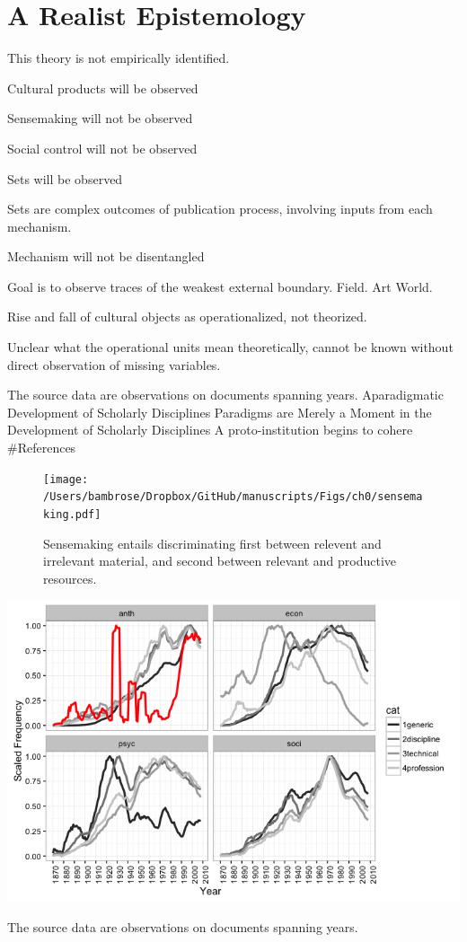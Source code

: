 \documentclass[]{article}
\begin{document}
\section{A Realist Epistemology}\label{a-realist-epistemology}

This theory is not empirically identified.

Cultural products will be observed

Sensemaking will not be observed

Social control will not be observed

Sets will be observed

Sets are complex outcomes of publication process, involving inputs from
each mechanism.

Mechanism will not be disentangled

Goal is to observe traces of the weakest external boundary. Field. Art
World.

Rise and fall of cultural objects as operationalized, not theorized.

Unclear what the operational units mean theoretically, cannot be known
without direct observation of missing variables.

The source data are observations on documents spanning years.
Aparadigmatic Development of Scholarly Disciplines Paradigms are Merely
a Moment in the Development of Scholarly Disciplines A proto-institution
begins to cohere \#References



\begin{figure}[htbp]
\centering
\texttt{[image: /Users/bambrose/Dropbox/GitHub/manuscripts/Figs/ch0/sensemaking.pdf]}
\caption{Sensemaking entails discriminating first between relevent and
irrelevant material, and second between relevant and productive
resources.}
\end{figure}

\begin{center}\includegraphics{Figs/ch0/disciplines-1} \end{center}

The source data are observations on documents spanning years.
\end{document}
